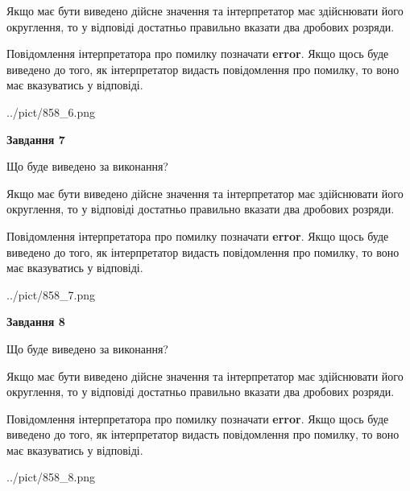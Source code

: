 \documentclass[12pt, ukrainian]{article}
\begin{document}
{\begin {Large}
Якщо має бути виведено дійсне значення та інтерпретатор має здійснювати його округлення, 
то у відповіді достатньо правильно вказати два дробових розряди.

Повідомлення інтерпретатора про помилку позначати \textbf{error}.
Якщо щось буде виведено до того, як інтерпретатор видасть повідомлення про помилку, 
то воно має вказуватись у відповіді. \par

\begin{center}
	{../pict/858_6.png}
\end{center}
\newpage

{\begin {center}\textbf{Завдання 7}\end {center}}\par
Що буде виведено за виконання? \par

Якщо має бути виведено дійсне значення та інтерпретатор має здійснювати його округлення, 
то у відповіді достатньо правильно вказати два дробових розряди.

Повідомлення інтерпретатора про помилку позначати \textbf{error}.
Якщо щось буде виведено до того, як інтерпретатор видасть повідомлення про помилку, 
то воно має вказуватись у відповіді. \par

\begin{center}
	{../pict/858_7.png}
\end{center}
\newpage

{\begin {center}\textbf{Завдання 8}\end {center}}\par
Що буде виведено за виконання? \par

Якщо має бути виведено дійсне значення та інтерпретатор має здійснювати його округлення, 
то у відповіді достатньо правильно вказати два дробових розряди.

Повідомлення інтерпретатора про помилку позначати \textbf{error}.
Якщо щось буде виведено до того, як інтерпретатор видасть повідомлення про помилку, 
то воно має вказуватись у відповіді. \par

\begin{center}
	{../pict/858_8.png}
\end{center}
\newpage


\end{Large}}
\end{document}
